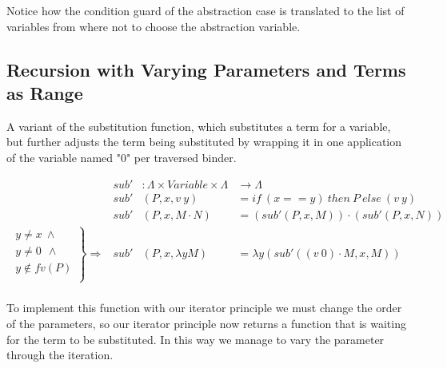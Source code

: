 \documentclass{entcs}
\begin{document}
Notice how the condition guard of the abstraction case is translated to the list of variables from where not to choose the abstraction variable.

 \hspace{5px}

\subsection{Recursion with Varying Parameters and Terms as Range}

A variant of the substitution function, which substitutes a term for a variable, but further adjusts the term being substituted by wrapping it in one application of the variable named "0" per traversed binder.

\[
\begin{array}{rrll}
&sub' &: \Lambda \times Variable \times  \Lambda &   \rightarrow  \Lambda  \\
&sub' &(P , x , v\ y)         &= if\ (x == y)\ then\ P\ else\ (v\ y)   \\
&sub' &(P , x , M \cdot N)    &= (sub' (P , x , M)) \cdot (sub' (P , x , N)) \\
\left. 
\begin{array}{c}
y \neq x  \ \wedge \\
 y \neq 0\ \  \wedge \\
 y \not\in fv(P) \\
\end{array} \right\} \Rightarrow&sub' &(P , x , \lambda y M)   &= \lambda y (sub' ((v\ 0) \cdot M , x , M)) \\
\end{array} \]

To implement this function with our iterator principle we must change the order of the parameters, so our iterator principle now returns a function that is waiting for the term to be substituted. In this way we manage to vary the parameter through the iteration.

 \hspace{5px}


\end{document}
